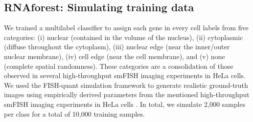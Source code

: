 \subsection{RNAforest: Simulating training data}
We trained a multilabel classifier to assign each gene in every cell labels from five categories: (i) nuclear (contained in the volume of the nucleus), (ii) cytoplasmic (diffuse throughout the cytoplasm), (iii) nuclear edge (near the inner/outer nuclear membrane), (iv) cell edge (near the cell membrane), and (v) none (complete spatial randomness). These categories are a consolidation of those observed in several high-throughput smFISH imaging experiments in HeLa cells\cite{battichImagebasedTranscriptomicsThousands2013,stoegerComputerVisionImagebased2015,samacoitsComputationalFrameworkStudy2018,chouaibDualProteinmRNALocalization2020}. We used the FISH-quant simulation framework to generate realistic ground-truth images using empirically derived parameters from the mentioned high-throughput smFISH imaging experiments in HeLa cells \cite{samacoitsComputationalFrameworkStudy2018}. In total, we simulate 2,000 samples per class for a total of 10,000 training samples.

